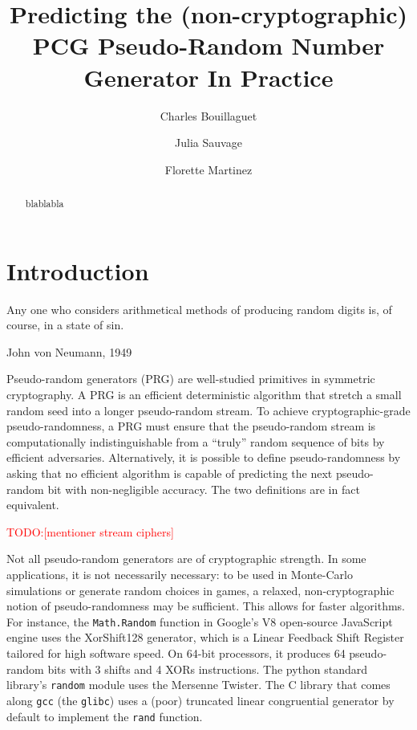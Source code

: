 \documentclass[submission,svgnames,journal=tosc]{iacrtrans}
\title[Predicting the PCG Pseudo-Random Number Generator in Practice]{Predicting the (non-cryptographic) PCG Pseudo-Random Number Generator In Practice}
\author{Charles Bouillaguet\inst{1} \and Julia Sauvage\inst{2} \and Florette Martinez\inst{3}}
\institute{%
University of Lille, France \\ 
\email{charles.bouillaguet@univ-lille.fr}
\and 
Sorbonne University \\
\email{julia.sauvage@etu.upmc.fr}
\and 
LIP6, CNRS, SU ? \\
\email{florette.martinez@lip6.fr}

}
\newcommand{\todo}[1]{\textcolor{red}{TODO:[#1]}}
\begin{document}
\maketitle


\begin{abstract}
  blablabla
\end{abstract}

\section{Introduction} %

\epigraph{Any one who considers arithmetical methods of producing random digits is, of course, in a state of sin.}{John von Neumann, 1949}


Pseudo-random generators (PRG) are well-studied primitives in symmetric
cryptography. A PRG is an efficient deterministic algorithm that stretch a small
random seed into a longer pseudo-random stream. To achieve cryptographic-grade
pseudo-randomness, a PRG must ensure that the pseudo-random stream is
computationally indistinguishable from a ``truly'' random sequence of bits by
efficient adversaries. Alternatively, it is possible to define pseudo-randomness
by asking that no efficient algorithm is capable of predicting the next
pseudo-random bit with non-negligible accuracy. The two definitions are in fact
equivalent.

\todo{mentioner stream ciphers}

Not all pseudo-random generators are of cryptographic strength. In some
applications, it is not necessarily necessary: to be used in Monte-Carlo
simulations or generate random choices in games, a relaxed, non-cryptographic
notion of pseudo-randomness may be sufficient. This allows for faster
algorithms. For instance, the \texttt{Math.Random} function in Google's V8
open-source JavaScript engine uses the \textsf{XorShift128} generator, which is
a Linear Feedback Shift Register tailored for high software speed. On 64-bit
processors, it produces 64 pseudo-random bits with 3 shifts and 4 XORs
instructions. The \textsf{python} standard library's \texttt{random} module uses
the Mersenne Twister. The \textsf{C} library that comes along \texttt{gcc} (the
\texttt{glibc}) uses a (poor) truncated linear congruential generator by default
to implement the \texttt{rand} function.
\end{document}
